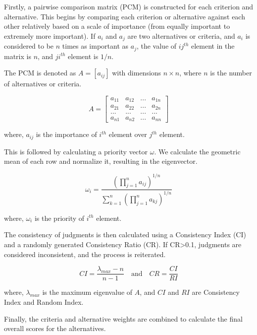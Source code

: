 Firstly, a pairwise comparison matrix (PCM) is constructed for each criterion and alternative.
This begins by comparing each criterion or alternative against each other relatively based on a scale of importance (from equally important to extremely more important). 
If $a_i$ and $a_j$ are two alternatives or criteria, and $a_i$ is considered to be $n$ times as important as $a_j$, the value of $ij^{th}$ element in the matrix is $n$, and $ji^{th}$ element is $1/n$.

The PCM is denoted as $A=[a_{ij}]$ with dimensions $n \times n$, where $n$ is the number of alternatives or criteria. 

\begin{equation}
    A = 
    \begin{bmatrix}
    a_{11} & a_{12} & ... & a_{1n} \\
    a_{21} & a_{22} & ... & a_{2n} \\
    ... & ... & ... & ... \\
    a_{n1} & a_{n2} & ... & a_{nn}
    \end{bmatrix}        
\end{equation}

where, $a_{ij}$ is the importance of $i^{th}$ element over $j^{th}$ element.

This is followed by calculating a priority vector $\omega$. 
We calculate the geometric mean of each row and normalize it, resulting in the eigenvector.

\begin{equation}
\omega_i = \frac{\left(\prod_{j=1}^{n}a_{ij}\right)^{1/n}}{\sum_{k=1}^{n}\left(\prod_{j=1}^{n}a_{kj}\right)^{1/n}}
\end{equation}

where, $\omega_i$ is the priority of $i^{th}$ element.

The consistency of judgments is then calculated using a Consistency Index (CI) and a randomly generated Consistency Ratio (CR). If CR>0.1, judgments are considered inconsistent, and the process is reiterated.

\begin{equation}
CI=\frac{\lambda_{max} - n}{n - 1} \quad \text{and} \quad CR = \frac{CI}{RI}
\end{equation}

where, $\lambda_{max}$ is the maximum eigenvalue of $A$, and $CI$ and $RI$ are Consistency Index and Random Index.

Finally, the criteria and alternative weights are combined to calculate the final overall scores for the alternatives.

